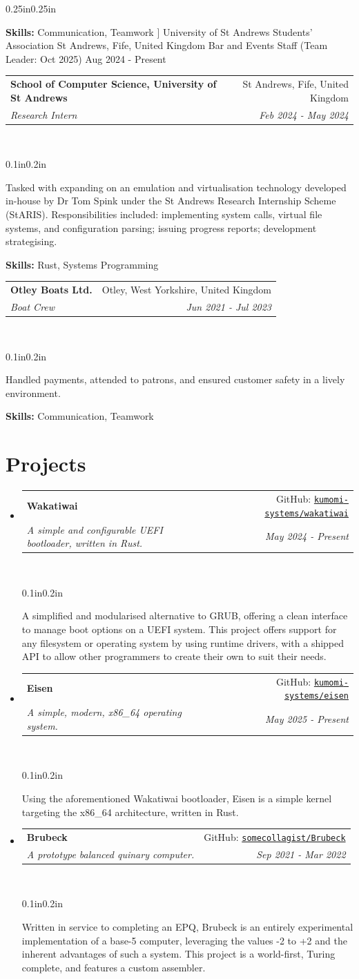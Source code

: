 \documentclass[a4paper]{article}
\makeatletter
\newcommand{\resumeSubheading}[5][]{
  \vspace{2pt}\item
    \begin{tabular*}{0.875\textwidth}[t]{l@{\extracolsep{\fill}}r}
      \textbf{#2} & #3 \\
      \textit{\small#4} & \textit{\small #5} \\
    \end{tabular*}\\
    \vspace{-5pt}
    \begin{adjustwidth}{0.1in}{0.2in}
      #1
    \end{adjustwidth}
    \vspace{10pt}
}
\newcommand{\resumeSubheadingList}[1]{
  \begin{itemize}
    #1
  \end{itemize}
}
\makeatother
\begin{document}
\begin{adjustwidth}{0.25in}{0.25in}
{        \textbf{Skills:} {Communication, Teamwork}
      ]
        {University of St Andrews Students' Association}
        {St Andrews, Fife, United Kingdom}
        {Bar and Events Staff (Team Leader: Oct 2025)}
        {Aug 2024 {-} Present}
      \resumeSubheading[
        Tasked with expanding on an emulation and virtualisation technology
        developed in-house by Dr Tom Spink under the St Andrews Research
        Internship Scheme (StARIS). Responsibilities included: implementing
        system calls, virtual file systems, and configuration parsing; issuing
        progress reports; development strategising.

        \textbf{Skills:} {Rust, Systems Programming}
      ]
        {School of Computer Science, University of St Andrews}
        {St Andrews, Fife, United Kingdom}
        {Research Intern}
        {Feb 2024 {-} May 2024}
      \resumeSubheading[
        Handled payments, attended to patrons, and ensured customer safety in a
        lively environment.

        \textbf{Skills:} {Communication, Teamwork}
      ]
        {Otley Boats Ltd.}
        {Otley, West Yorkshire, United Kingdom}
        {Boat Crew}
        {Jun 2021 {-} Jul 2023}
    }

  \newpage{}

  \section{Projects}
    \resumeSubheadingList{
      \resumeSubheading[
        A simplified and modularised alternative to GRUB, offering a clean
        interface to manage boot options on a UEFI system. This project offers
        support for any filesystem or operating system by using runtime
        drivers, with a shipped API to allow other programmers to create their
        own to suit their needs.
      ]
        {Wakatiwai}
        {GitHub: \href{https://github.com/kumomi-systems/wakatiwai}
          {\texttt{kumomi{-}systems/wakatiwai}}}
        {A simple and configurable UEFI bootloader, written in Rust.}
        {May 2024 {-} Present}
      \resumeSubheading[
        Using the aforementioned Wakatiwai bootloader, Eisen is a simple kernel
        targeting the x86\_64 architecture, written in Rust.
      ]
        {Eisen}
        {GitHub: \href{https://github.com/kumomi-systems/eisen}
          {\texttt{kumomi{-}systems/eisen}}}
        {A simple, modern, x86\_64 operating system.}
        {May 2025 {-} Present}
      \resumeSubheading[
        Written in service to completing an EPQ, Brubeck is an entirely
        experimental implementation of a base-5 computer, leveraging the values
        {-}2 to +2 and the inherent advantages of such a system. This project
        is a world-first, Turing complete, and features a custom assembler. 
      ]
        {Brubeck}
        {GitHub: \href{https://github.com/somecollagist/Brubeck}
          {\texttt{somecollagist/Brubeck}}}
        {A prototype balanced quinary computer.}
        {Sep 2021 {-} Mar 2022}
    }


\end{adjustwidth}
\end{document}
